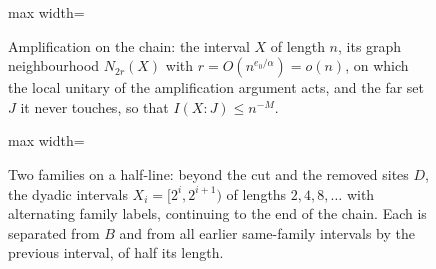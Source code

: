 \begin{figure}[t]
\centering
\begin{adjustbox}{max width=\linewidth}

\end{adjustbox}
\caption{Amplification on the chain: the interval $X$ of length $n$, its graph neighbourhood $N_{2r}(X)$ with $r=O(n^{e_0/\alpha})=o(n)$, on which the local unitary of the amplification argument acts, and the far set $J$ it never touches, so that $I(X:J)\le n^{-M}$.}\label{fig:chain-amplify}
\end{figure}

\begin{figure}[t]
\centering
\begin{adjustbox}{max width=\linewidth}

\end{adjustbox}
\caption{Two families on a half-line: beyond the cut and the removed sites $D$, the dyadic intervals $X_i=[2^i,2^{i+1})$ of lengths $2,4,8,\dots$ with alternating family labels, continuing to the end of the chain. Each is separated from $B$ and from all earlier same-family intervals by the previous interval, of half its length.}\label{fig:chain-families}
\end{figure}
